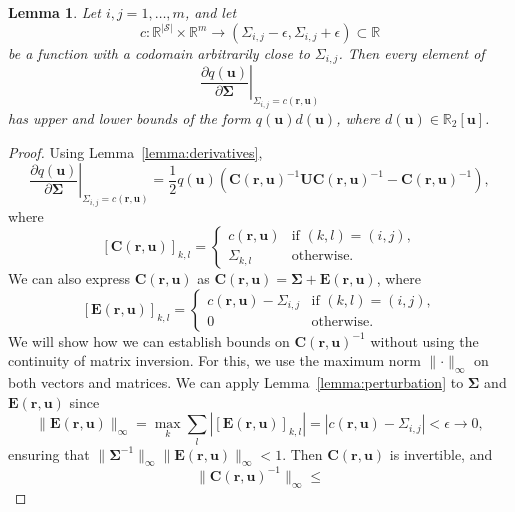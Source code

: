 \documentclass{mpaper}
\newtheorem{lemma}[theorem]{Lemma}
\begin{document}
\begin{lemma} \label{lemma:bound3}
  Let $i, j = 1, \dots, m$, and let
  \[
    c \colon \mathbb{R}^{|\mathcal{S}|} \times \mathbb{R}^m \to (\Sigma_{i,j} -
    \epsilon, \Sigma_{i,j} + \epsilon) \subset \mathbb{R}
  \]
  be a function with a codomain arbitrarily close to $\Sigma_{i,j}$. Then every
  element of
  \[
    \left. \frac{\partial q(\mathbf{u})}{\partial \bm\Sigma} \right|_{\Sigma_{i,j} =
    c(\mathbf{r}, \mathbf{u})}
  \]
  has upper and lower bounds of the form $q(\mathbf{u})d(\mathbf{u})$, where
  $d(\mathbf{u}) \in \mathbb{R}_2[\mathbf{u}]$.
\end{lemma}
\begin{proof}
  Using Lemma~\ref{lemma:derivatives},
  \[
    \left. \frac{\partial q(\mathbf{u})}{\partial \bm\Sigma} \right|_{\Sigma_{i,j} =
    c(\mathbf{r}, \mathbf{u})} =
    \frac{1}{2}q(\mathbf{u})(\mathbf{C}(\mathbf{r},
    \mathbf{u})^{-1}\mathbf{UC}(\mathbf{r}, \mathbf{u})^{-1} -
    \mathbf{C}(\mathbf{r}, \mathbf{u})^{-1}),
  \]
  where
  \[
    [\mathbf{C}(\mathbf{r}, \mathbf{u})]_{k,l} =
    \begin{cases}
      c(\mathbf{r}, \mathbf{u}) & \text{if } (k, l) = (i, j), \\
      \Sigma_{k,l} & \text{otherwise.}
    \end{cases}
  \]
  We can also express $\mathbf{C}(\mathbf{r},\mathbf{u})$ as
  $\mathbf{C}(\mathbf{r}, \mathbf{u}) = \bm\Sigma + \mathbf{E}(\mathbf{r},
  \mathbf{u})$, where
  \[
    [\mathbf{E}(\mathbf{r}, \mathbf{u})]_{k,l} =
    \begin{cases}
      c(\mathbf{r}, \mathbf{u}) - \Sigma_{i,j} & \text{if } (k, l) = (i, j), \\
      0 & \text{otherwise.}
    \end{cases}
  \]
  We will show how we can establish bounds on $\mathbf{C}(\mathbf{r},
  \mathbf{u})^{-1}$ without using the continuity of matrix inversion. For this,
  we use the maximum norm $\lVert \cdot \rVert_\infty$ on both vectors and
  matrices. We can apply Lemma~\ref{lemma:perturbation} to $\bm\Sigma$ and
  $\mathbf{E}(\mathbf{r}, \mathbf{u})$ since
  \[
    \lVert \mathbf{E}(\mathbf{r}, \mathbf{u}) \rVert_\infty = \max_k \sum_l
    |[\mathbf{E}(\mathbf{r}, \mathbf{u})]_{k,l}| = |c(\mathbf{r}, \mathbf{u}) -
    \Sigma_{i,j}| < \epsilon \to 0,
  \]
  ensuring that $\lVert \bm\Sigma^{-1} \rVert_\infty
  \lVert \mathbf{E}(\mathbf{r}, \mathbf{u}) \rVert_\infty < 1$. Then
  $\mathbf{C}(\mathbf{r}, \mathbf{u})$ is invertible, and
  \[
    \lVert \mathbf{C}(\mathbf{r}, \mathbf{u})^{-1} \rVert_\infty \le
\]
\end{proof}
\end{document}
